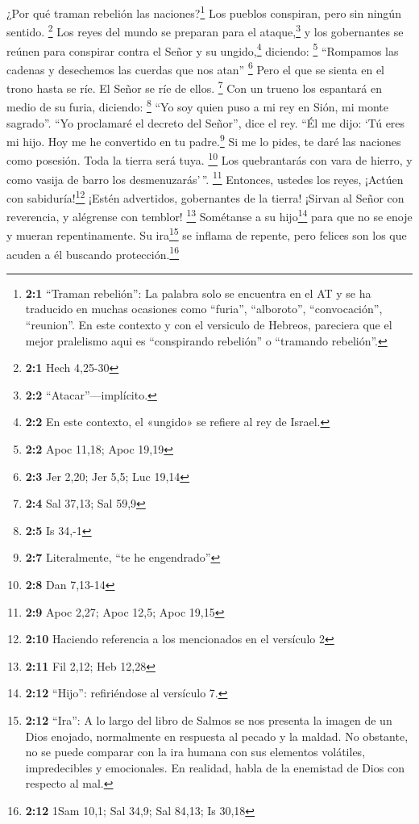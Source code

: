  ¿Por qué traman rebelión las naciones?\footnote{\textbf{2:1}
  ``Traman rebelión'': La palabra solo se encuentra en el AT y se ha
  traducido en muchas ocasiones como ``furia'', ``alboroto'',
  ``convocación'', ``reunion''. En este contexto y con el versiculo de
  Hebreos, pareciera que el mejor pralelismo aqui es ``conspirando
  rebelión'' o ``tramando rebelión''.} Los pueblos conspiran, pero sin
ningún sentido. \footnote{\textbf{2:1} Hech 4,25-30}  Los
reyes del mundo se preparan para el ataque,\footnote{\textbf{2:2}
  ``Atacar''---implícito.} y los gobernantes se reúnen para conspirar
contra el Señor y su ungido,\footnote{\textbf{2:2} En este contexto, el
  «ungido» se refiere al rey de Israel.} diciendo: \footnote{\textbf{2:2}
  Apoc 11,18; Apoc 19,19}  ``Rompamos las cadenas y
desechemos las cuerdas que nos atan'' \footnote{\textbf{2:3} Jer 2,20;
  Jer 5,5; Luc 19,14}  Pero el que se sienta en el trono
hasta se ríe. El Señor se ríe de ellos. \footnote{\textbf{2:4} Sal
  37,13; Sal 59,9}  Con un trueno los espantará en medio
de su furia, diciendo: \footnote{\textbf{2:5} Is 34,-1} 
``Yo soy quien puso a mi rey en Sión, mi monte sagrado''. 
``Yo proclamaré el decreto del Señor'', dice el rey. ``Él me dijo: `Tú
eres mi hijo. Hoy me he convertido en tu padre.\footnote{\textbf{2:7}
  Literalmente, ``te he engendrado''}  Si me lo pides, te
daré las naciones como posesión. Toda la tierra será tuya. \footnote{\textbf{2:8}
  Dan 7,13-14}  Los quebrantarás con vara de hierro, y
como vasija de barro los desmenuzarás'\,''. \footnote{\textbf{2:9} Apoc
  2,27; Apoc 12,5; Apoc 19,15}  Entonces, ustedes los
reyes, ¡Actúen con sabiduría!\footnote{\textbf{2:10} Haciendo referencia
  a los mencionados en el versículo 2} ¡Estén advertidos, gobernantes de
la tierra!  ¡Sirvan al Señor con reverencia, y alégrense
con temblor! \footnote{\textbf{2:11} Fil 2,12; Heb 12,28}
 Sométanse a su hijo\footnote{\textbf{2:12} ``Hijo'':
  refiriéndose al versículo 7.} para que no se enoje y mueran
repentinamente. Su ira\footnote{\textbf{2:12} ``Ira'': A lo largo del
  libro de Salmos se nos presenta la imagen de un Dios enojado,
  normalmente en respuesta al pecado y la maldad. No obstante, no se
  puede comparar con la ira humana con sus elementos volátiles,
  impredecibles y emocionales. En realidad, habla de la enemistad de
  Dios con respecto al mal.} se inflama de repente, pero felices son los
que acuden a él buscando protección.\footnote{\textbf{2:12} 1Sam 10,1;
  Sal 34,9; Sal 84,13; Is 30,18}

